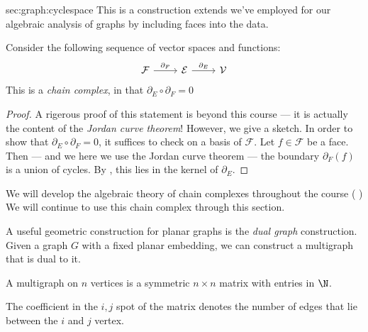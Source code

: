 \begin{stationconnection}{sec:graph:cyclespace}
This is a construction extends we've employed for our algebraic analysis of graphs  by including faces into the data.  
\begin{claim}
Consider the following sequence of vector spaces and functions:
\[ \begin{tikzcd}
\mathcal F \arrow{r}{\partial_F} & \mathcal E \arrow{r}{\partial_E} & \mathcal V
\end{tikzcd}\]
This is a \emph{chain complex}, in that $\partial_E\circ \partial_F =0$ \label{def:planarcomplex}
\label{claim:dsquarezerograph}
\end{claim}
\begin{proof}
A rigerous proof of this statement is beyond this course --- it is actually the content of the \emph{Jordan curve theorem}! However, we give a sketch. In order to show that $\partial_E\circ \partial_F=0$, it suffices to check on a basis of $\mathcal F$. Let $f\in \mathcal F$ be a face. Then --- and we here we use the Jordan curve theorem --- the boundary  $\partial_F(f)$ is a union of cycles. By , this lies in the kernel of $\partial_E$. 
\end{proof}
We will develop the algebraic theory of chain complexes throughout the course ( )
We will continue to use this chain complex through this section.
\end{stationconnection}


A useful geometric construction for planar graphs is the \emph{dual graph} construction. Given a graph $G$ with a fixed planar embedding, we can construct a multigraph that is dual to it. 
\begin{definition}[Multigraph]
 A multigraph on $n$ vertices is a symmetric $n\times n$ matrix with entries in $\N$. 
\end{definition}
The coefficient in the $i,j$ spot of the matrix denotes the number of edges that lie between the $i$ and $j$ vertex. 

